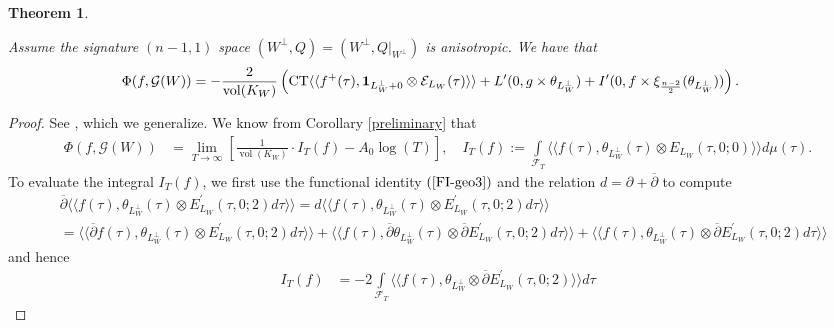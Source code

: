 \documentclass{amsart}
\newtheorem{theorem}{Theorem}[section]
\theoremstyle{definition}
\theoremstyle{definition}
\theoremstyle{definition}
\begin{document}
\begin{theorem}\label{realquad} 

Assume the signature $(n-1, 1)$ space $(W^{\perp}, Q) = (W^{\perp}, Q\vert_{W^{\perp}})$ is anisotropic. We have that
\begin{align*} \Phi(f, \mathcal{G}(W)) &= - \frac{2}{ \operatorname{vol}(K_W)} \left(
\operatorname{CT} \langle \langle f^+(\tau), {\bf{1}}_{L_W^{\perp} + 0} \otimes \mathcal{E}_{L_W}(\tau) \rangle \rangle
+ L'(0, g \times \theta_{L_W^{\perp}}) +I'(0, f \times \xi_{\frac{n-2}{2}}(\theta_{L_W^{\perp}})) \right). \end{align*} 

\end{theorem}

\begin{proof} See \cite[Theorem 4.15]{VO}, which we generalize. We know from Corollary \ref{preliminary} that  
\begin{align*} \Phi(f, \mathcal{G}(W)) &= \lim_{T \rightarrow \infty} \left[ \frac{1}{\operatorname{vol}(K_W)} \cdot I_T(f) - A_0 \log(T) \right], \quad
 I_T(f) := \int\limits_{\mathcal{F}_T} \langle \langle f(\tau), \theta_{L_W^{\perp}}(\tau) \otimes E_{L_W}(\tau, 0; 0) \rangle \rangle  d \mu (\tau). \end{align*}
To evaluate the integral $I_T(f)$, we first use the functional identity $(\ref{FI-geo3})$ and the relation $d = \partial + \overline{\partial}$ to compute 
\begin{equation*}\begin{aligned} &\overline{\partial} \langle \langle f(\tau), \theta_{L_W^{\perp}}(\tau) \otimes  E_{L_W}^{\prime}(\tau, 0; 2) d \tau \rangle \rangle
= d \langle \langle f(\tau), \theta_{L_W^{\perp}}(\tau) \otimes  E_{L_W}^{\prime}(\tau, 0; 2) d \tau \rangle \rangle \\
&=\langle \langle \overline{\partial} f(\tau), \theta_{L_W^{\perp}}(\tau) \otimes E_{L_W}^{\prime}(\tau, 0; 2) d \tau \rangle \rangle
+ \langle \langle f(\tau), \overline{\partial} \theta_{L_W^{\perp}}(\tau) \otimes \overline{\partial} E_{L_W}^{\prime}(\tau, 0; 2) d \tau \rangle \rangle
+ \langle \langle f(\tau),  \theta_{L_W^{\perp}}(\tau) \otimes \overline{\partial} E_{L_W}^{\prime}(\tau, 0; 2) d \tau \rangle \rangle\end{aligned}\end{equation*} 
and hence 
\begin{align*} I_T(f) &= -2 \int\limits_{\mathcal{F}_T} \langle \langle f(\tau), \theta_{L_W^{\perp}} \otimes \overline{\partial} E_{L_W}^{\prime}(\tau, 0; 2) \rangle \rangle d \tau 

\end{align*}
\end{proof}
\end{document}
